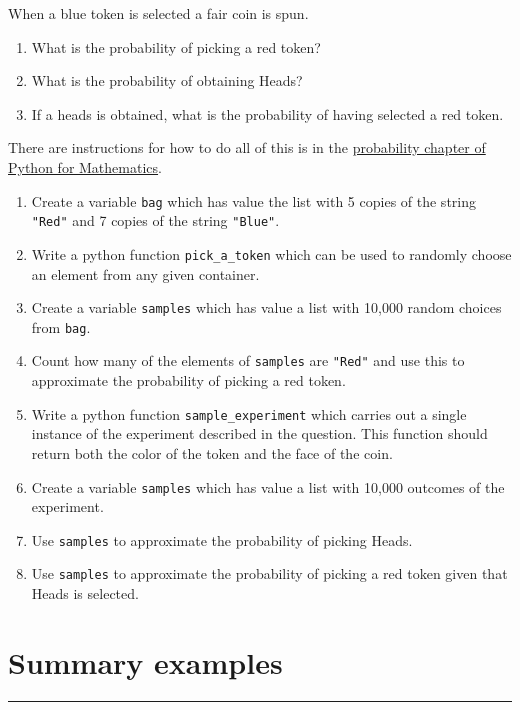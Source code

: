\documentclass{article}
\begin{document}
When a blue token is selected a fair coin is spun.

\begin{enumerate}
    \item What is the probability of picking a red token?
    \item What is the probability of obtaining Heads?
    \item If a heads is obtained, what is the probability of having selected a red token.
\end{enumerate}

There are instructions for how to do all of this is in the
\href{https://vknight.org/pfm/tools-for-mathematics/06-probability/how/main.html}{probability chapter of Python for Mathematics}.


\begin{enumerate}
    \item Create a variable \texttt{bag} which has value the
        list with 5 copies of the string \texttt{"Red"} and 7
        copies of the string \texttt{"Blue"}.
    \item Write a python function \texttt{pick_a_token} which can be
        used to randomly choose an element from any given container.
    \item Create a variable \texttt{samples} which has value a list
        with 10,000 random choices from \texttt{bag}.
    \item Count how many of the elements of \texttt{samples} are
        \texttt{"Red"} and use this to approximate the probability of
        picking a red token.
    \item Write a python function \texttt{sample_experiment} which
        carries out a single instance of the experiment described in the
        question. This function should return both the color of the token and
        the face of the coin.
    \item Create a variable \texttt{samples} which has value a list
        with 10,000 outcomes of the experiment.
    \item Use \texttt{samples} to approximate the probability of picking
        Heads.
    \item Use \texttt{samples} to approximate the probability of picking
        a red token given that Heads is selected.
\end{enumerate}


\section{Summary examples}
\hrule
\end{document}
